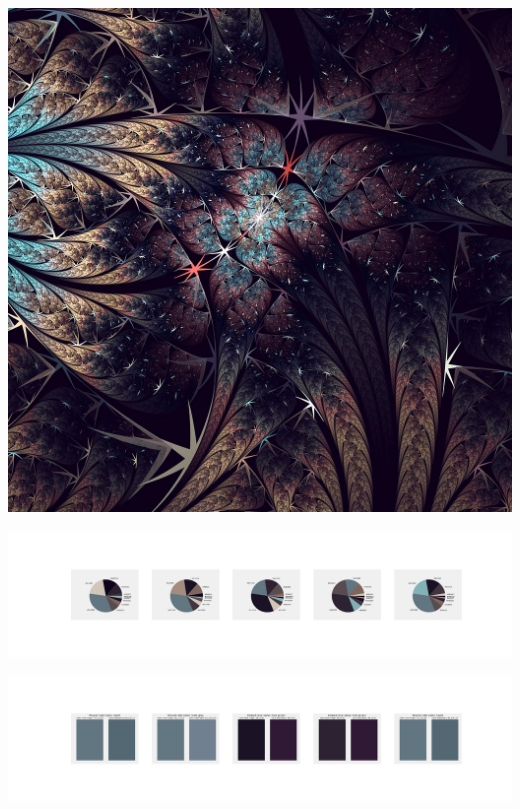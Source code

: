 \documentclass[11pt]{article}
\begin{document}
\begin{landscape}
    \begin{center}
    \includegraphics[width=\textwidth]{./nbimg/file (233).jpg}
    \end{center}

    \begin{center}
    \includegraphics[width=250mm]{./nbimg/pie-149.jpg}
    \end{center}

    \begin{center}
    \includegraphics[width=250mm]{./nbimg/peak-149.jpg}
    \end{center}
    


\end{landscape}
\end{document}
